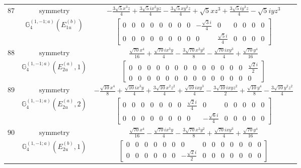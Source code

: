 \documentclass[fleqn,8pt,landscape]{jsarticle}
\begin{document}
\begin{longtable}{ccc}
$ 87 $ & $ \text{symmetry} $ & $ - \frac{3 \sqrt{5} x^{3} z}{4} + \frac{3 \sqrt{5} i x^{2} y z}{4} - \frac{3 \sqrt{5} x y^{2} z}{4} + \sqrt{5} x z^{3} + \frac{3 \sqrt{5} i y^{3} z}{4} - \sqrt{5} i y z^{3} $ \\
$  $ & $ \mathbb{G}_{4}^{(1,-1;a)}(E_{1u}^{(b)}) $ & $ \begin{bmatrix} 0 & 0 & 0 & 0 & 0 & 0 & 0 & 0 & - \frac{\sqrt{3} i}{4} & 0 & 0 & 0 & 0 & 0 \\ 0 & 0 & 0 & 0 & 0 & 0 & 0 & 0 & 0 & \frac{\sqrt{5} i}{4} & 0 & 0 & 0 & 0 \end{bmatrix} $ \\ \hline
$ 88 $ & $ \text{symmetry} $ & $ \frac{\sqrt{70} x^{4}}{16} + \frac{\sqrt{70} i x^{3} y}{4} - \frac{3 \sqrt{70} x^{2} y^{2}}{8} - \frac{\sqrt{70} i x y^{3}}{4} + \frac{\sqrt{70} y^{4}}{16} $ \\
$  $ & $ \mathbb{G}_{4}^{(1,-1;a)}(E_{2u}^{(a)},1) $ & $ \begin{bmatrix} 0 & 0 & 0 & 0 & 0 & 0 & 0 & 0 & 0 & 0 & 0 & 0 & 0 & \frac{\sqrt{2} i}{2} \\ 0 & 0 & 0 & 0 & 0 & 0 & 0 & 0 & 0 & 0 & 0 & 0 & 0 & 0 \end{bmatrix} $ \\ \hline
$ 89 $ & $ \text{symmetry} $ & $ - \frac{\sqrt{10} x^{4}}{8} + \frac{\sqrt{10} i x^{3} y}{4} + \frac{3 \sqrt{10} x^{2} z^{2}}{4} + \frac{\sqrt{10} i x y^{3}}{4} - \frac{3 \sqrt{10} i x y z^{2}}{2} + \frac{\sqrt{10} y^{4}}{8} - \frac{3 \sqrt{10} y^{2} z^{2}}{4} $ \\
$  $ & $ \mathbb{G}_{4}^{(1,-1;a)}(E_{2u}^{(a)},2) $ & $ \begin{bmatrix} 0 & 0 & 0 & 0 & 0 & 0 & 0 & \frac{\sqrt{2} i}{4} & 0 & 0 & 0 & 0 & 0 & 0 \\ 0 & 0 & 0 & 0 & 0 & 0 & 0 & 0 & - \frac{\sqrt{6} i}{4} & 0 & 0 & 0 & 0 & 0 \end{bmatrix} $ \\ \hline
$ 90 $ & $ \text{symmetry} $ & $ \frac{\sqrt{70} x^{4}}{16} - \frac{\sqrt{70} i x^{3} y}{4} - \frac{3 \sqrt{70} x^{2} y^{2}}{8} + \frac{\sqrt{70} i x y^{3}}{4} + \frac{\sqrt{70} y^{4}}{16} $ \\
$  $ & $ \mathbb{G}_{4}^{(1,-1;a)}(E_{2u}^{(b)},1) $ & $ \begin{bmatrix} 0 & 0 & 0 & 0 & 0 & 0 & 0 & 0 & 0 & 0 & 0 & 0 & 0 & 0 \\ 0 & 0 & 0 & 0 & 0 & 0 & - \frac{\sqrt{2} i}{2} & 0 & 0 & 0 & 0 & 0 & 0 & 0 \end{bmatrix} $ \\ \hline

\end{longtable}
\end{document}
